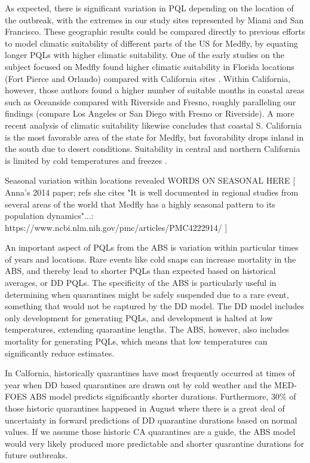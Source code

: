 \documentclass[10pt,a4paper,twocolumn]{article}
\begin{document}
As expected, there is significant variation in PQL depending on the location of the outbreak, 
with the extremes in our study sites represented by Miami and San Francisco.
These geographic results could be
compared directly to previous efforts to model climatic suitability of different parts of the US 
for Medfly, by equating longer PQLs with higher climatic suitability.
One of the early studies on the subject focused on Medfly found higher climatic suitability in 
Florida locations (Fort Pierce and Orlando) compared with California 
sites \cite{messenger_bioclimatic_1954}. 
Within California, however, those authors found a higher number of suitable months in coastal 
areas such as Oceanside compared with Riverside and Fresno, roughly paralleling our 
findings (compare Los Angeles or San Diego with Fresno or Riverside).
A more recent analysis of climatic suitability likewise concludes that coastal 
S. California is the most favorable area of the state for Medfly, but 
favorability drops inland in the south due to desert conditions.
Suitability in central and northern California is limited by cold temperatures and 
freezes \cite{gutierrez_assessing_2011}. 


Seasonal variation within locations revealed WORDS ON SEASONAL HERE
[
Anna's 2014 paper; refs she cites "It is well documented in regional studies from several areas of the world that Medfly has a highly seasonal pattern to its population dynamics"...:
https://www.ncbi.nlm.nih.gov/pmc/articles/PMC4222914/
]


An important aspect of PQLs from the ABS is variation within particular times of years and locations. 
Rare events like cold snaps can increase mortality in the ABS,
and thereby lead to shorter PQLs than expected based on historical averages, or DD PQLs.
The specificity of the ABS is particularly useful in determining 
when quarantines might be safely suspended due to a rare event,
something that would not be captured by the DD model.
The DD model includes only development for generating PQLs,
and development is halted at low temperatures, extending quarantine lengths.
The ABS, however, also includes mortality for generating PQLs,
which means that low temperatures can significantly reduce estimates.

In Calfornia, historically quarantines have most frequently occurred at times of year when 
DD based quarantines are drawn out by cold weather and the MED-FOES ABS model predicts significantly
shorter durations.
Furthermore, 30\% of those historic quarantines happened in August where there is a great 
deal of uncertainty in forward predictions of DD quarantine durations based on normal values.
If we assume those historic CA quarantines are a guide, the ABS model would very likely
produced more predictable and shorter quarantine durations for future outbreaks.
\end{document}
